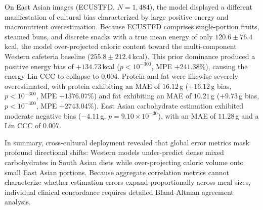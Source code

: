 \documentclass[utf8]{FrontiersinVancouver}
\begin{document}
On East Asian images (ECUSTFD, $N=1,484$), the model displayed a different manifestation of cultural bias characterized by large positive energy and macronutrient overestimation. Because ECUSTFD comprises single-portion fruits, steamed buns, and discrete snacks with a true mean energy of only $120.6 \pm 76.4$\,kcal, the model over-projected caloric content toward the multi-component Western cafeteria baseline ($255.8 \pm 212.4$\,kcal). This prior dominance produced a positive energy bias of $+134.73$\,kcal ($p < 10^{-300}$, MPE $+241.38\%$), causing the energy Lin CCC to collapse to $0.004$. Protein and fat were likewise severely overestimated, with protein exhibiting an MAE of $16.12$\,g ($+16.12$\,g bias, $p < 10^{-300}$, MPE $+1376.07\%$) and fat exhibiting an MAE of $10.21$\,g ($+9.73$\,g bias, $p < 10^{-300}$, MPE $+2743.04\%$). East Asian carbohydrate estimation exhibited moderate negative bias ($-4.11$\,g, $p = 9.10 \times 10^{-30}$), with an MAE of $11.28$\,g and a Lin CCC of $0.007$.

In summary, cross-cultural deployment revealed that global error metrics mask profound directional shifts: Western models under-predict dense mixed carbohydrates in South Asian diets while over-projecting caloric volume onto small East Asian portions. Because aggregate correlation metrics cannot characterize whether estimation errors expand proportionally across meal sizes, individual clinical concordance requires detailed Bland-Altman agreement analysis.
\end{document}
